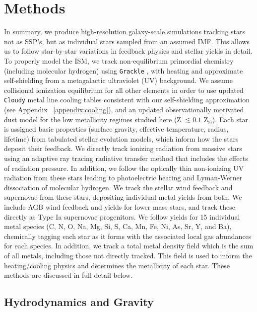 \documentclass[twocolumn]{aastex61}
\begin{document}
\section{Methods}
\label{sec:methods}
In 
     summary, 
we produce high-resolution galaxy-scale simulations tracking stars not as SSP's, but as individual stars sampled from an assumed IMF.
This allows us to follow star-by-star variations in feedback physics and stellar yields in detail. To properly model the ISM, we track non-equilibrium primordial chemistry (including molecular hydrogen) using \texttt{Grackle} \citep{GrackleMethod}, with heating and approximate self-shielding from a metagalactic ultraviolet (UV) background. We 
    assume collisional ionization equilibrium for all other elements in order to
use updated \texttt{Cloudy} metal line cooling tables consistent with our self-shielding approximation (see Appendix ~\ref{appendix:cooling}), and an updated observationally motivated dust model for the low metallicity regimes studied here (Z $\lesssim 0.1$ Z$_{\odot}$). Each star is assigned basic properties (surface gravity, effective temperature, radius, lifetime) from tabulated stellar evolution models, which inform how the stars deposit their feedback. We directly track ionizing radiation from massive stars using an adaptive ray tracing radiative transfer method that includes the effects of radiation pressure. In addition, we follow the optically thin non-ionizing UV radiation from these stars leading to photoelectric heating and Lyman-Werner dissociation of molecular hydrogen. We track the stellar wind feedback and supernovae from these stars, depositing individual metal yields from both. We include AGB wind feedback and yields for lower mass stars, and track these directly as Type Ia supernovae progenitors. We follow yields for 15 individual metal species (C, N, O, Na, Mg, Si, S, Ca, Mn, Fe, Ni, As, Sr, Y, and Ba), chemically tagging each star
   as it forms
with the associated local gas abundances for each species. In addition, we track a total metal density field which is the sum of all metals, including those not directly tracked. This field is used to inform the heating/cooling physics and determines the metallicity of each star. These methods are discussed in full detail below.

\subsection{Hydrodynamics and Gravity}
\label{sec:hydro}
\end{document}
